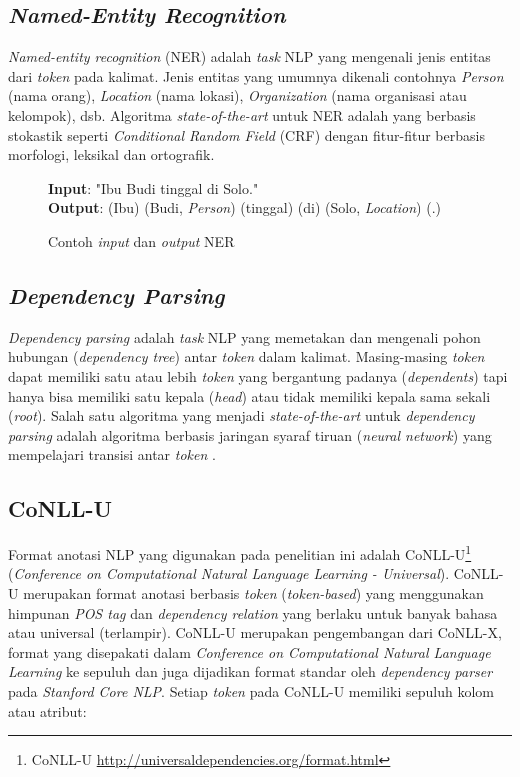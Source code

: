 \subsection{\textit{Named-Entity Recognition}}

\textit{Named-entity recognition} (NER) adalah \textit{task} NLP yang mengenali jenis entitas dari \textit{token} pada kalimat. Jenis entitas yang umumnya dikenali contohnya \textit{Person} (nama orang), \textit{Location} (nama lokasi), \textit{Organization} (nama organisasi atau kelompok), dsb. Algoritma \textit{state-of-the-art} untuk NER adalah yang berbasis stokastik seperti \textit{Conditional Random Field} (CRF) dengan fitur-fitur berbasis morfologi, leksikal dan ortografik.

\begin{figure}
	\begin{mdframed}
		\textbf{Input}: "Ibu Budi tinggal di Solo." \\		
		\textbf{Output}: (Ibu) (Budi, \textit{Person}) (tinggal) (di) (Solo, \textit{Location}) (.)
	\end{mdframed}
	\caption{Contoh \textit{input} dan \textit{output} NER}
	\label{fig:example_ner}
\end{figure}

\subsection{\textit{Dependency Parsing}}

\textit{Dependency parsing} adalah \textit{task} NLP yang memetakan dan mengenali pohon hubungan (\textit{dependency tree}) antar \textit{token} dalam kalimat. Masing-masing \textit{token} dapat memiliki satu atau lebih \textit{token} yang bergantung padanya (\textit{dependents}) tapi hanya bisa memiliki satu kepala (\textit{head}) atau tidak memiliki kepala sama sekali (\textit{root}). Salah satu algoritma yang menjadi \textit{state-of-the-art} untuk \textit{dependency parsing} adalah algoritma berbasis jaringan syaraf tiruan (\textit{neural network}) yang mempelajari transisi antar \textit{token} \citep{chen2014fast}. 

\subsection{CoNLL-U}

Format anotasi NLP yang digunakan pada penelitian ini adalah CoNLL-U\footnote{CoNLL-U \url{http://universaldependencies.org/format.html}} (\textit{Conference on Computational Natural Language Learning - Universal}). CoNLL-U merupakan format anotasi berbasis \textit{token} (\textit{token-based}) yang menggunakan himpunan \textit{POS tag} dan \textit{dependency relation} yang berlaku untuk banyak bahasa atau universal \citep{nivre2016universal} (terlampir). CoNLL-U merupakan pengembangan dari CoNLL-X, format yang disepakati dalam \textit{Conference on Computational Natural Language Learning} ke sepuluh dan juga dijadikan format standar oleh \textit{dependency parser} pada \textit{Stanford Core NLP}. Setiap \textit{token} pada CoNLL-U memiliki sepuluh kolom atau atribut:

